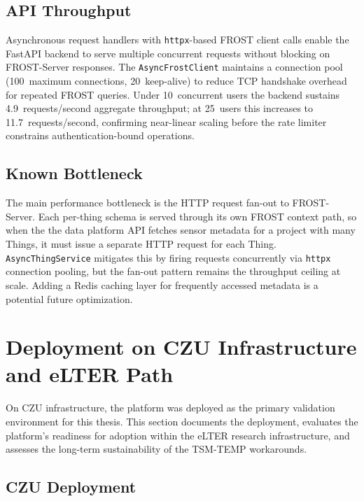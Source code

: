\subsection{API Throughput}
\label{sec:test-perf-api}

Asynchronous request handlers with \texttt{httpx}-based FROST
client calls enable the FastAPI backend to serve multiple concurrent requests without blocking on
FROST-Server responses. The \texttt{AsyncFrostClient} maintains a connection pool
(100~maximum connections, 20~keep-alive) to reduce TCP handshake overhead for repeated
FROST queries. Under 10~concurrent users the backend sustains 4.9~requests/second
aggregate throughput; at 25~users this increases to 11.7~requests/second, confirming
near-linear scaling before the rate limiter constrains authentication-bound operations.

\clearpage
\subsection{Known Bottleneck}
\label{sec:test-perf-bottleneck}

The main performance bottleneck is the HTTP request fan-out to FROST-Server. Each
per-thing schema is served through its own FROST context path, so when the
the data platform API fetches sensor metadata for a project with many Things, it must
issue a separate HTTP request for each Thing. \texttt{AsyncThingService} mitigates
this by firing requests concurrently via \texttt{httpx} connection pooling, but the
fan-out pattern remains the throughput ceiling at scale. Adding a Redis caching layer
for frequently accessed metadata is a potential future optimization.

\section{Deployment on CZU Infrastructure and eLTER Path}
\label{sec:test-deployment}

On CZU infrastructure, the platform was deployed as the primary validation environment
for this thesis. This section documents the deployment, evaluates the platform's
readiness for adoption within the eLTER research infrastructure, and assesses the
long-term sustainability of the TSM-TEMP workarounds.

\subsection{CZU Deployment}
\label{sec:test-deployment-czu}

